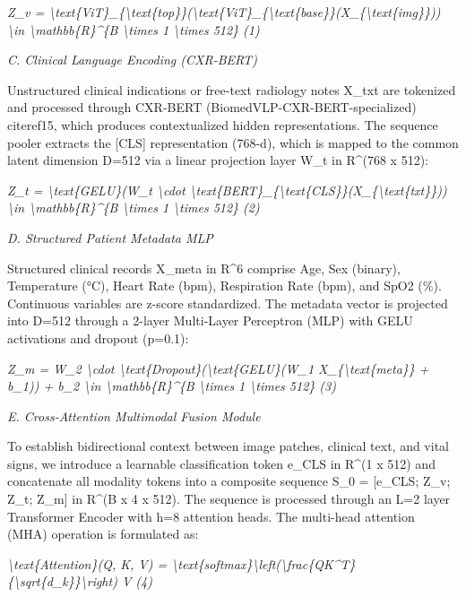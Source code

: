 \documentclass[
]{article}
\begin{document}
\emph{Z\_v =
\textbackslash text\{ViT\}\_\{\textbackslash text\{top\}\}(\textbackslash text\{ViT\}\_\{\textbackslash text\{base\}\}(X\_\{\textbackslash text\{img\}\}))
\textbackslash in \textbackslash mathbb\{R\}\^{}\{B \textbackslash times
1 \textbackslash times 512\} (1)}

\emph{C. Clinical Language Encoding (CXR-BERT)}

Unstructured clinical indications or free-text radiology notes X\_txt
are tokenized and processed through CXR-BERT
(BiomedVLP-CXR-BERT-specialized) \\cite{ref15}, which produces contextualized
hidden representations. The sequence pooler extracts the {[}CLS{]}
representation (768-d), which is mapped to the common latent dimension
D=512 via a linear projection layer W\_t in R\^{}(768 x 512):

\emph{Z\_t = \textbackslash text\{GELU\}(W\_t \textbackslash cdot
\textbackslash text\{BERT\}\_\{\textbackslash text\{CLS\}\}(X\_\{\textbackslash text\{txt\}\}))
\textbackslash in \textbackslash mathbb\{R\}\^{}\{B \textbackslash times
1 \textbackslash times 512\} (2)}

\emph{D. Structured Patient Metadata MLP}

Structured clinical records X\_meta in R\^{}6 comprise Age, Sex
(binary), Temperature (°C), Heart Rate (bpm), Respiration Rate (bpm),
and SpO2 (\%). Continuous variables are z-score standardized. The
metadata vector is projected into D=512 through a 2-layer Multi-Layer
Perceptron (MLP) with GELU activations and dropout (p=0.1):

\emph{Z\_m = W\_2 \textbackslash cdot
\textbackslash text\{Dropout\}(\textbackslash text\{GELU\}(W\_1
X\_\{\textbackslash text\{meta\}\} + b\_1)) + b\_2 \textbackslash in
\textbackslash mathbb\{R\}\^{}\{B \textbackslash times 1
\textbackslash times 512\} (3)}

\emph{E. Cross-Attention Multimodal Fusion Module}

To establish bidirectional context between image patches, clinical text,
and vital signs, we introduce a learnable classification token e\_CLS in
R\^{}(1 x 512) and concatenate all modality tokens into a composite
sequence S\_0 = {[}e\_CLS; Z\_v; Z\_t; Z\_m{]} in R\^{}(B x 4 x 512).
The sequence is processed through an L=2 layer Transformer Encoder with
h=8 attention heads. The multi-head attention (MHA) operation is
formulated as:

\emph{\textbackslash text\{Attention\}(Q, K, V) =
\textbackslash text\{softmax\}\textbackslash left(\textbackslash frac\{QK\^{}T\}\{\textbackslash sqrt\{d\_k\}\}\textbackslash right)
V (4)}
\end{document}

